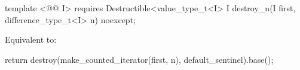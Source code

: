 {\color{addclr}
\begin{codeblock}
template <@@ I>
requires
  Destructible<value_type_t<I>
I destroy_n(I first, difference_type_t<I> n) noexcept;
\end{codeblock}

\pnum
\effects Equivalent to:
\begin{codeblock}
    return destroy(make_counted_iterator(first, n), default_sentinel{}).base();
\end{codeblock}
} %